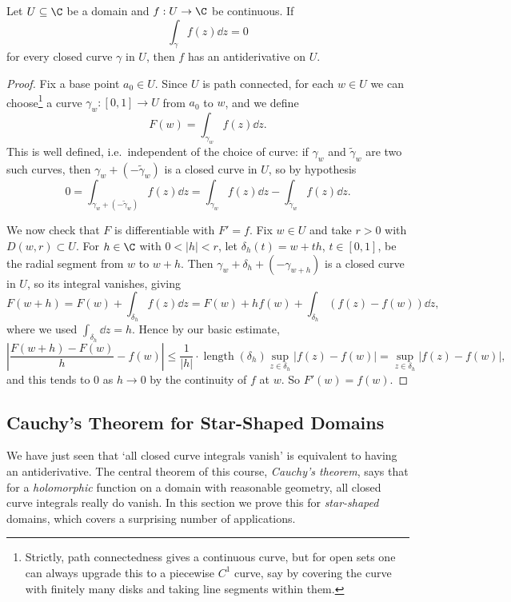 \begin{theorem}
    Let $U \subseteq \C$ be a domain and $f: U \rightarrow \C$ be continuous. If
    $$
    \int_\gamma f(z) \dd z = 0
    $$
    for every closed curve $\gamma$ in $U$, then $f$ has an antiderivative on $U$.
\end{theorem}
\begin{proof}
    Fix a base point $a_0 \in U$. Since $U$ is path connected, for each $w \in U$ we can choose\footnote{Strictly, path connectedness gives a continuous curve, but for open sets one can always upgrade this to a piecewise $C^1$ curve, say by covering the curve with finitely many disks and taking line segments within them.} a curve $\gamma_w: [0, 1] \rightarrow U$ from $a_0$ to $w$, and we define
    $$
    F(w) = \int_{\gamma_w} f(z) \dd z.
    $$
    This is well defined, i.e.\ independent of the choice of curve: if $\gamma_w$ and $\tilde{\gamma}_w$ are two such curves, then $\gamma_w + (-\tilde{\gamma}_w)$ is a closed curve in $U$, so by hypothesis
    $$
    0 = \int_{\gamma_w + (-\tilde{\gamma}_w)} f(z) \dd z = \int_{\gamma_w} f(z) \dd z - \int_{\tilde{\gamma}_w} f(z) \dd z.
    $$

    We now check that $F$ is differentiable with $F' = f$. Fix $w \in U$ and take $r > 0$ with $D(w, r) \subset U$. For $h \in \C$ with $0 < |h| < r$, let $\delta_h(t) = w + th$, $t \in [0, 1]$, be the radial segment from $w$ to $w + h$. Then $\gamma_w + \delta_h + (-\gamma_{w + h})$ is a closed curve in $U$, so its integral vanishes, giving
    $$
    F(w + h) = F(w) + \int_{\delta_h} f(z) \dd z = F(w) + h f(w) + \int_{\delta_h} (f(z) - f(w)) \dd z,
    $$
    where we used $\int_{\delta_h} \dd z = h$. Hence by our basic estimate,
    $$
    \left|\frac{F(w + h) - F(w)}{h} - f(w)\right| \leq \frac{1}{|h|} \cdot \operatorname{length}(\delta_h) \sup_{z \in \delta_h} |f(z) - f(w)| = \sup_{z \in \delta_h} |f(z) - f(w)|,
    $$
    and this tends to $0$ as $h \rightarrow 0$ by the continuity of $f$ at $w$. So $F'(w) = f(w)$.
\end{proof}

\subsection{Cauchy's Theorem for Star-Shaped Domains}

We have just seen that `all closed curve integrals vanish' is equivalent to having an antiderivative. The central theorem of this course, \emph{Cauchy's theorem}, says that for a \emph{holomorphic} function on a domain with reasonable geometry, all closed curve integrals really do vanish. In this section we prove this for \emph{star-shaped} domains, which covers a surprising number of applications.

